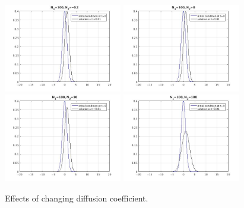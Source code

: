 \documentclass[12pt]{article}
\begin{document}
\begin{figure}[H]
\begin{center}

\includegraphics[width=0.46\textwidth]{diffu-02.jpg} 
\includegraphics[width=0.46\textwidth]{diffu0.jpg}  \\
\hspace*{0.2truecm}
\includegraphics[width=0.46\textwidth]{diffu10.jpg}  
\includegraphics[width=0.46\textwidth]{diffu100.jpg}  \\

\caption{Effects of changing diffusion coefficient.} 
\label{fig2}
\end{center}
\end{figure}
\end{document}
